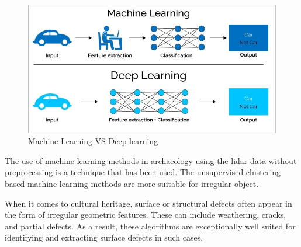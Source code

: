 \begin{figure}[H]
\centering
\includegraphics[width=15cm]{images/deepLearningVSmachineLearning.jpeg}
\caption[Machine Learning VS Deep learning]{Machine Learning VS Deep learning\cite{deepLearningVSmachineLearning}}
\end{figure}

The use of machine learning methods in archaeology using the \ac{lidar} data without preprocessing is a technique that has been used. The unsupervised clustering based machine learning methods are more suitable for irregular object\cite{deeplearningRawLidarData}.

When it comes to cultural heritage, surface or structural defects often appear in the form of irregular geometric features. These can include weathering, cracks, and partial defects. As a result, these algorithms are exceptionally well suited for identifying and extracting surface defects in such cases\cite{deeplearningRawLidarData}.